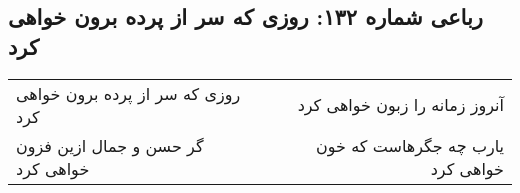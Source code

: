 \begin{center}
\section*{رباعی شماره ۱۳۲: روزی که سر از پرده برون خواهی کرد}
\label{sec:sh132}
\begin{longtable}{l p{0.5cm} r}
روزی که سر از پرده برون خواهی کرد
&&
آنروز زمانه را زبون خواهی کرد
\\
گر حسن و جمال ازین فزون خواهی کرد
&&
یارب چه جگرهاست که خون خواهی کرد
\\
\end{longtable}
\end{center}
